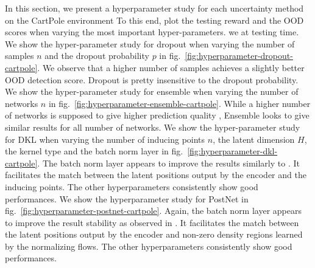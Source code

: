In this section, we present a hyperparameter study for each uncertainty method on the CartPole environment To this end, plot the testing reward and the OOD scores when varying the most important hyper-parameters. we at testing time. We show the hyper-parameter study for dropout when varying the number of samples $n$ and the dropout probability $p$ in fig.~\ref{fig:hyperparameter-dropout-cartpole}. We observe that a higher number of samples achieves a slightly better OOD detection score. Dropout is pretty insensitive to the dropout probability. We show the hyper-parameter study for ensemble when varying the number of networks $n$ in fig.~\ref{fig:hyperparameter-ensemble-cartpole}. While a higher number of networks is supposed to give higher prediction quality \cite{ensembles}, Ensemble looks to give similar results for all number of networks. We show the hyper-parameter study for DKL when varying the number of inducing points $n$, the latent dimension $H$, the kernel type and the batch norm layer in fig.~\ref{fig:hyperparameter-dkl-cartpole}. The batch norm layer appears to improve the results similarly to \cite{charpentier2020}. It facilitates the match between the latent positions output by the encoder and the inducing points. The other hyperparameters consistently show good performances. We show the hyperparameter study for PostNet in fig.~\ref{fig:hyperparameter-postnet-cartpole}. Again, the batch norm layer appears to improve the result stability as observed in \cite{charpentier2020}. It facilitates the match between the latent positions output by the encoder and non-zero density regions learned by the normalizing flows. The other hyperparameters consistently show good performances.




